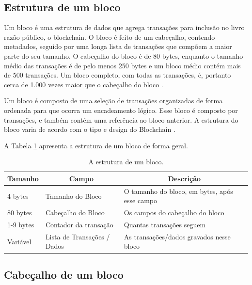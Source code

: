     \subsection{Estrutura de um bloco}

        Um bloco é uma estrutura de dados que agrega transações para inclusão no livro razão público, o blockchain. O bloco é feito de um cabeçalho, contendo metadados, seguido por uma longa lista de transações que compõem a maior parte do seu tamanho. O cabeçalho do bloco é de 80 bytes, enquanto o tamanho médio das transações é de pelo menos 250 bytes e um bloco médio contém mais de 500 transações. Um bloco completo, com todas as transações, é, portanto cerca de 1.000 vezes maior que o cabeçalho do bloco \cite{mastering_blockchain_andreas}.

        Um bloco é composto de uma seleção de transações organizadas de forma ordenada para que ocorra um encadeamento lógico. Esse bloco é composto por transações, e também contém uma referência ao bloco anterior. A estrutura do bloco varia de acordo com o tipo e design do Blockchain \cite{mastering_blockchain}.
        
        A Tabela \ref{tabela_estrutura_de_um_bloco} apresenta a estrutura de um bloco de forma geral.
            
        \begin{table}[h]
            \centering
            \caption{A estrutura de um bloco.}
                \begin{tabular}{|l|l|l|}
                \hline
                \multicolumn{1}{|c|}{\textbf{Tamanho}} & \multicolumn{1}{c|}{\textbf{Campo}} & \multicolumn{1}{c|}{\textbf{Descrição}} \\ \hline
                 4 bytes & Tamanho do Bloco & O tamanho do bloco, em bytes, após esse campo \\ \hline
                 80 bytes   & Cabeçalho do Bloco & Os campos do cabeçalho do bloco  \\ \hline
                 1-9 bytes  & Contador da transação & Quantas transações seguem  \\ \hline
                 Variável   & Lista de Transações / Dados   & As transações/dados gravados nesse bloco\\ \hline
                \end{tabular}
            \label{tabela_estrutura_de_um_bloco}
        \end{table}




    \subsection{Cabeçalho de um bloco}

